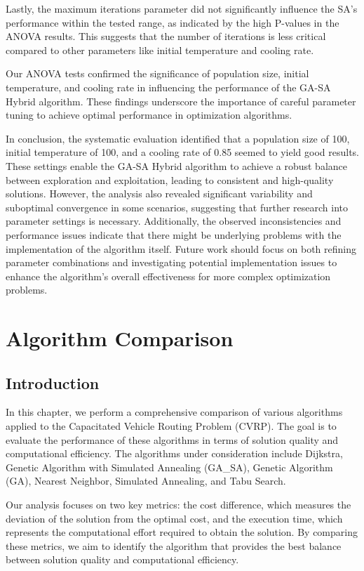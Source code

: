 \documentclass{article}
\begin{document}
    Lastly, the maximum iterations parameter did not significantly influence the SA's performance within the tested range, as indicated by the high P-values in the ANOVA results. This suggests that the number of iterations is less critical compared to other parameters like initial temperature and cooling rate.

    Our ANOVA tests confirmed the significance of population size, initial temperature, and cooling rate in influencing the performance of the GA-SA Hybrid algorithm. These findings underscore the importance of careful parameter tuning to achieve optimal performance in optimization algorithms.

    In conclusion, the systematic evaluation identified that a population size of 100, initial temperature of 100, and a cooling rate of 0.85 seemed to yield good results. These settings enable the GA-SA Hybrid algorithm to achieve a robust balance between exploration and exploitation, leading to consistent and high-quality solutions. However, the analysis also revealed significant variability and suboptimal convergence in some scenarios, suggesting that further research into parameter settings is necessary. Additionally, the observed inconsistencies and performance issues indicate that there might be underlying problems with the implementation of the algorithm itself. Future work should focus on both refining parameter combinations and investigating potential implementation issues to enhance the algorithm's overall effectiveness for more complex optimization problems.


    \section{Algorithm Comparison}

    \subsection{Introduction}

    In this chapter, we perform a comprehensive comparison of various algorithms applied to the Capacitated Vehicle Routing Problem (CVRP). The goal is to evaluate the performance of these algorithms in terms of solution quality and computational efficiency. The algorithms under consideration include Dijkstra, Genetic Algorithm with Simulated Annealing (GA\_SA), Genetic Algorithm (GA), Nearest Neighbor, Simulated Annealing, and Tabu Search.

    Our analysis focuses on two key metrics: the cost difference, which measures the deviation of the solution from the optimal cost, and the execution time, which represents the computational effort required to obtain the solution. By comparing these metrics, we aim to identify the algorithm that provides the best balance between solution quality and computational efficiency.
\end{document}

